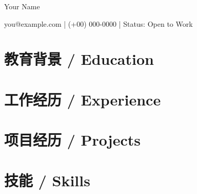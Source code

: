\documentclass[10pt, letterpaper]{article}
\def\jobtype{job_1}
\begin{document}
{\fontsize{22pt}{22pt}\selectfont Your Name\par}
\vspace{5pt}
{\normalsize
you@example.com \hspace{5pt}|\hspace{5pt}
(+00) 000-0000 \hspace{5pt}|\hspace{5pt}
Status: Open to Work\par}
\vspace{8pt}

\section{教育背景 / Education}


\section{工作经历 / Experience}


\section{项目经历 / Projects}


\section{技能 / Skills}

\end{document}
